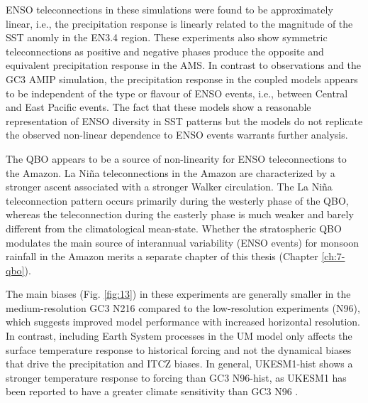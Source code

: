 ENSO teleconnections in these simulations were found to be approximately linear, i.e., the precipitation response is linearly related to the magnitude of the SST anomly in the EN3.4 region. These experiments also show symmetric teleconnections as positive and negative phases produce the opposite and equivalent precipitation response in the AMS. In contrast to observations and the GC3 AMIP simulation, the precipitation response in the coupled models appears to be independent of the type or flavour of ENSO events, i.e., between Central and East Pacific events. The fact that these models show a reasonable representation of ENSO diversity in SST patterns but the models  do not replicate the observed non-linear dependence to ENSO events warrants further analysis.

The QBO appears to be a source of non-linearity for ENSO teleconnections to the Amazon. La Niña  teleconnections in the Amazon are characterized by a stronger ascent associated with a stronger Walker circulation. The La Niña teleconnection pattern occurs primarily during the westerly phase of the QBO, whereas the teleconnection during the easterly phase is much weaker and barely different from the climatological mean-state. Whether the stratospheric QBO modulates the main source of interannual variability (ENSO events) for monsoon rainfall in the Amazon merits a separate chapter of this thesis (Chapter \ref{ch:7-qbo}). 

The main biases (Fig. \ref{fig:13}) in these experiments are generally smaller in the medium-resolution GC3 N216 compared to the low-resolution experiments (N96), which suggests improved model performance with increased horizontal resolution.
In contrast, including Earth System processes in the UM model only affects the surface temperature response to historical forcing and not the dynamical biases that drive the precipitation and ITCZ biases. 
 In general, UKESM1-hist shows a stronger temperature response to forcing than GC3 N96-hist, as UKESM1 has been reported to have a  greater climate sensitivity than GC3 N96 \citep{andrews2019,sellar2019}. %


